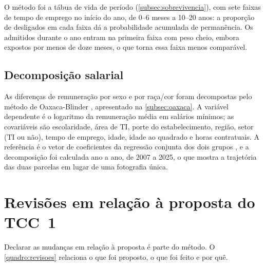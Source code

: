 O método foi a tábua de vida de período (\autoref{subsec:sobrevivencia}), com sete faixas de tempo de emprego no início do ano, de 0--6 meses a 10--20 anos: a proporção de desligados em cada faixa dá a probabilidade acumulada de permanência. Os admitidos durante o ano entram na primeira faixa com peso cheio, embora expostos por menos de doze meses, o que torna essa faixa menos comparável.

\subsection{Decomposição salarial}
\label{subsec:metodo-oaxaca}

As diferenças de remuneração por sexo e por raça/cor foram decompostas pelo método de Oaxaca-Blinder \cite{Oaxaca1973, Blinder1973}, apresentado na \autoref{subsec:oaxaca}. A variável dependente é o logaritmo da remuneração média em salários mínimos; as covariáveis são escolaridade, área de TI, porte do estabelecimento, região, setor (TI ou não), tempo de emprego, idade, idade ao quadrado e horas contratuais. A referência é o vetor de coeficientes da regressão conjunta dos dois grupos \cite{Neumark1988}, e a decomposição foi calculada ano a ano, de 2007 a 2025, o que mostra a trajetória das duas parcelas em lugar de uma fotografia única.

\section{Revisões em relação à proposta do TCC~1}
\label{sec:revisoes}

Declarar as mudanças em relação à proposta é parte do método. O \autoref{quadro:revisoes} relaciona o que foi proposto, o que foi feito e por quê.

